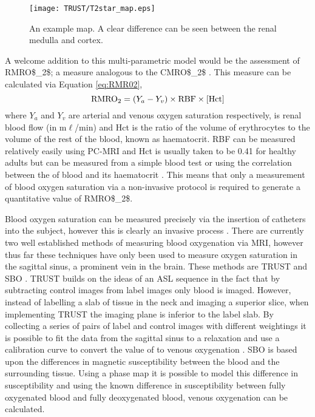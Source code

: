 \begin{figure}[H]
	\centering
	\texttt{[image: TRUST/T2star\_map.eps]}
	\caption{An example \ttwostar map. A clear difference can be seen between the renal medulla and cortex.}
	\label{fig:T2*map}	
\end{figure}

A welcome addition to this multi-parametric model would be the assessment of \ac{RMRO$_2$}; a measure analogous to the \ac{CMRO$_2$} \cite{chong_cerebral_2015}. This measure can be calculated via Equation \eqref{eq:RMR02},
\begin{equation}
\textup{RMRO}_{\textup{2}} = \left( Y_a - Y_v \right) \times \textup{RBF} \times \left[\textup{Hct}\right]
\label{eq:RMR02}
\end{equation}
where $Y_a$ and $Y_v$ are arterial and venous oxygen saturation respectively,  is renal blood flow (in m$\ell$/min) and Hct is the ratio of the volume of erythrocytes to the volume of the rest of the blood, known as haematocrit. \ac{RBF} can be measured relatively easily using \ac{PC}-\ac{MRI} \cite{jordan_velocity_1994} and Hct is usually taken to be 0.41 for healthy adults but can be measured from a simple blood test \cite{miao_reference_2002, gardener_dependence_2010} or using the correlation between the \tone of blood and its haematocrit \cite{shimada_vivo_2012}. This means that only a measurement of blood oxygen saturation via a non-invasive protocol is required to generate a quantitative value of \ac{RMRO$_2$}.

Blood oxygen saturation can be measured precisely via the insertion of catheters into the subject, however this is clearly an invasive process \cite{nagdyman_comparison_2005}. There are currently two well established methods of measuring blood oxygenation via \ac{MRI}, however thus far these techniques have only been used to measure oxygen saturation in the sagittal sinus, a prominent vein in the brain. These methods are \ac{TRUST} \cite{lu_quantitative_2008, xu_improving_2012, liu_testretest_2013, liu_multi-site_2016} and \ac{SBO} \cite{jain_mri_2010, jain_cerebral_2014, driver_global_2014, lee_multiplexed_2017}. \ac{TRUST} builds on the ideas of an \ac{ASL} sequence in the fact that by subtracting control images from label images only blood is imaged. However, instead of labelling a slab of tissue in the neck and imaging a superior slice, when implementing \ac{TRUST} the imaging plane is inferior to the label slab. By collecting a series of pairs of label and control images with different \ttwo weightings it is possible to fit the data from the sagittal sinus to a \ttwo relaxation and use a calibration curve to convert the value of \ttwo to venous oxygenation \cite{wright_estimating_1991}. \ac{SBO} is based upon the differences in magnetic susceptibility between the blood and the surrounding tissue. Using a phase map it is possible to model this difference in susceptibility and using the known difference in susceptibility between fully oxygenated blood and fully deoxygenated blood, venous oxygenation can be calculated.

